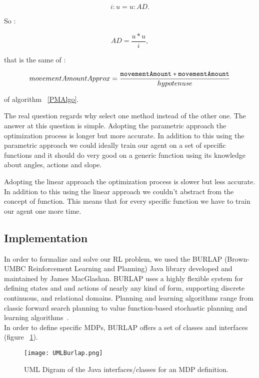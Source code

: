 \begin{equation}
	i : u =  u : AD.
\end{equation}

So :

\begin{equation}
	AD = \dfrac{u * u}{i},
\end{equation}

that is the same of :

\begin{equation}
	 movementAmountApprox = \dfrac{{\tt movementAmount} * {\tt movementAmount}}{hypotenuse}
\end{equation}

of algorithm ~\ref{PMAlgo}.

The real question regards why select one method instead of the other one. The answer at this question is simple. Adopting the parametric approach the optimization process is longer but more accurate. In addition to this using the parametric approach we could ideally train our agent on a set of specific functions and it should do very good on a generic function using its knowledge about angles, actions and slope. 

Adopting the linear approach the optimization process is slower but less accurate. In addition to this using the linear approach we couldn't abstract from the concept of function.  This means that for every specific function we have to train our agent one more time.

\subsection{Implementation}

In order to formalize and solve our RL problem, we used the BURLAP (Brown-UMBC Reinforcement Learning and Planning) Java library developed and maintained by James MacGlashan. BURLAP uses a highly flexible system for defining states and and actions of nearly any kind of form, supporting discrete continuous, and relational domains. Planning and learning algorithms range from classic forward search planning to value function-based stochastic planning and learning algorithms~\cite{BURLAPSite}. \\

In order to define specific MDPs, BURLAP offers a set of classes and interfaces (figure ~\ref{fig:UMLBurlap}).

\begin{figure} [h!]
	\texttt{[image: UMLBurlap.png]}
	\caption{UML Digram of the Java interfaces/classes for an MDP definition.}
	\label{fig:UMLBurlap}
\end{figure}


